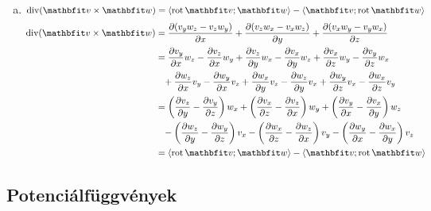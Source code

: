 \documentclass{szb-solution}
\begin{document}
\begin{enumerate}[a)]
  \item $\Div (\rvec v \times \rvec w) = \scalar{\rot \rvec v}{\rvec w} - \scalar{\rvec v}{\rot \rvec w}$
        \begin{align*}
          \Div (\rvec v \times \rvec w)
           & = \pdv{(v_y w_z - v_z w_y)}{x}
          + \pdv{(v_z w_x - v_x w_z)}{y}
          + \pdv{(v_x w_y - v_y w_x)}{z}
          \\
           & = \pdv{v_y}{x} w_z  - \pdv{v_z}{x} w_y
          + \pdv{v_z}{y} w_x  - \pdv{v_x}{y} w_z
          + \pdv{v_x}{z} w_y  - \pdv{v_y}{z} w_x
          \\
           & \phantom{=} + \pdv{w_z}{x} v_y - \pdv{w_y}{x} v_z
          + \pdv{w_x}{y} v_z - \pdv{w_z}{y} v_x
          + \pdv{w_y}{z} v_x - \pdv{w_x}{z} v_y
          \\
           & = \left( \pdv{v_z}{y} - \pdv{v_y}{z} \right) w_x
          + \left( \pdv{v_x}{z} - \pdv{v_z}{x} \right) w_y
          + \left( \pdv{v_y}{x} - \pdv{v_x}{y} \right) w_z
          \\
           & \phantom{=} - \left( \pdv{w_z}{y} - \pdv{w_y}{z} \right) v_x
          - \left( \pdv{w_x}{z} - \pdv{w_z}{x} \right) v_y
          - \left( \pdv{w_y}{x} - \pdv{w_x}{y} \right) v_z
          \\
           & = \scalar{\rot \rvec v}{\rvec w} - \scalar{\rvec v}{\rot \rvec w}
        \end{align*}
\end{enumerate}

\clearpage
\subsection{Potenciálfüggvények}
\end{document}
